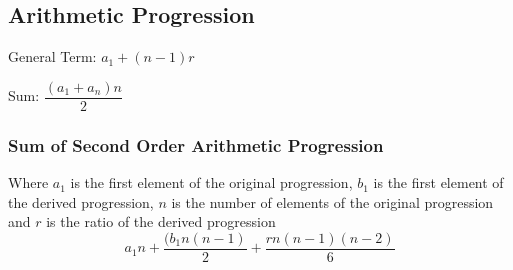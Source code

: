 \subsection{Arithmetic Progression}


General Term: $ a_{1} + (n - 1) r $

Sum: $ \dfrac{(a_{1} + a_{n}) n}{2} $

\subsubsection{Sum of Second Order Arithmetic Progression}
Where $a_{1}$ is the first element of the original progression, $b_{1}$ is the first element of the derived progression, $n$ is the number of elements of the original progression and $r$ is the ratio of the derived progression
$$ a_{1} n + \dfrac{(b_{1} n (n - 1)}{2} + \dfrac{r n (n - 1) (n - 2)}{6} $$